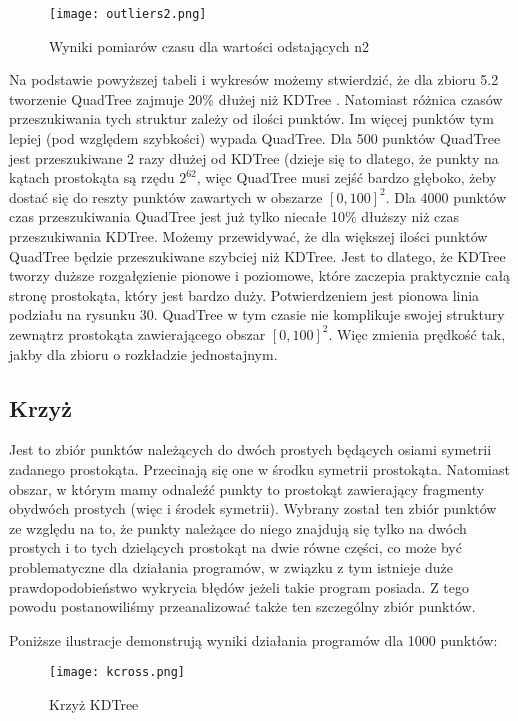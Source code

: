 \documentclass[a4paper, 12pt]{article}
\begin{document}
      \begin{figure}[h!]
      \centering
        \texttt{[image: outliers2.png]}
        \caption{Wyniki pomiarów czasu dla wartości odstających n2}
      \end{figure}

      \noindent
      \quad Na podstawie powyższej tabeli i wykresów możemy stwierdzić, że dla zbioru 5.2 tworzenie QuadTree zajmuje 20\% dłużej niż KDTree . Natomiast różnica czasów przeszukiwania tych struktur zależy od ilości punktów. Im więcej punktów tym lepiej (pod względem szybkości) wypada QuadTree. Dla 500 punktów QuadTree jest przeszukiwane 2 razy dłużej od KDTree (dzieje się to dlatego, że punkty na kątach prostokąta są rzędu $2^{62}$, więc QuadTree musi zejść bardzo głęboko, żeby dostać się do reszty punktów zawartych w obszarze $[0, 100]^2$. Dla 4000 punktów czas przeszukiwania QuadTree jest już tylko niecałe 10\% dłuższy niż czas przeszukiwania KDTree. Możemy przewidywać, że dla większej ilości punktów QuadTree będzie przeszukiwane szybciej niż KDTree. Jest to dlatego, że KDTree tworzy duższe rozgałęzienie pionowe i poziomowe, które zaczepia praktycznie całą stronę prostokąta, który jest bardzo duży. Potwierdzeniem jest pionowa linia podziału na rysunku 30. QuadTree w tym czasie nie komplikuje swojej struktury zewnątrz prostokąta zawierającego obszar $[0, 100]^2$. Więc zmienia prędkość tak, jakby dla zbioru o rozkładzie jednostajnym.

    \subsection{Krzyż}
      \quad Jest to zbiór punktów należących do dwóch prostych będących osiami symetrii zadanego prostokąta. Przecinają się one w środku symetrii prostokąta. Natomiast obszar, w którym mamy odnaleźć punkty to prostokąt zawierający fragmenty obydwóch prostych (więc i środek symetrii). Wybrany został ten zbiór punktów ze względu na to, że punkty należące do niego znajdują się tylko na dwóch prostych i to tych dzielących prostokąt na dwie równe części, co może być problematyczne dla działania programów, w związku z tym istnieje duże prawdopodobieństwo wykrycia błędów jeżeli takie program posiada. Z tego powodu postanowiliśmy przeanalizować także ten szczególny zbiór punktów. 

      \noindent
      \quad Poniższe ilustracje demonstrują wyniki działania programów dla 1000 punktów:

      \begin{figure}[h!]
      \centering
        \texttt{[image: kcross.png]}
        \caption{Krzyż KDTree}
      \end{figure}
\end{document}
